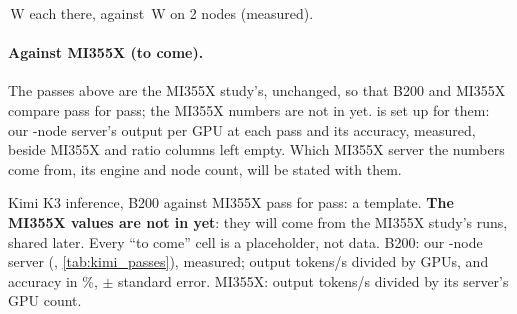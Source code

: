 \TriKimiFourTopMainW\,W each there, against \TriKimiTopMainW\,W on 2 nodes (measured).

\paragraph{Against MI355X (to come).} The passes above are the MI355X study's, unchanged, so that B200 and MI355X compare pass for pass; the MI355X numbers are not in yet.  is set up for them: our \TriKimiNodes-node server's output per GPU at each pass and its accuracy, measured, beside MI355X and ratio columns left empty. Which MI355X server the numbers come from, its engine and node count, will be stated with them.

\begin{table}[h]
  \caption{Kimi K3 inference, B200 against MI355X pass for pass: a template. \textbf{The MI355X values are not in yet}: they will come from the MI355X study's runs, shared later. Every ``to come'' cell is a placeholder, not data. B200: our \TriKimiNodes-node server (\TriKimiLayout, \cref{tab:kimi_passes}), measured; output tokens/s divided by \TriKimiGpus{} GPUs, and accuracy in \%, $\pm$ standard error. MI355X: output tokens/s divided by its server's GPU count.}
  \label{tab:kimi_mi355x}
  \centering\scriptsize
  \begin{adjustbox}{max width=\linewidth}
  \end{adjustbox}
\end{table}

